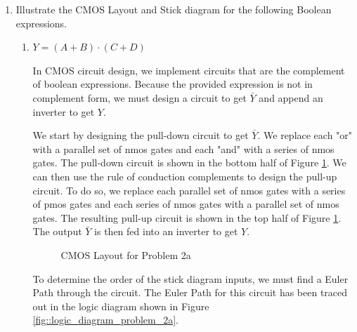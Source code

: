 \documentclass[fleqn]{article}
\begin{document}
\begin{enumerate}
		\item Illustrate the CMOS Layout and Stick diagram for the following Boolean expressions.
		
		\begin{enumerate}
			\item $Y = (A+B)\cdot(C+D)$
			
			In CMOS circuit design, we implement circuits that are the complement of boolean expressions. Because the provided expression is not in complement form, we must design a circuit to get $\bar{Y}$ and append an inverter to get $Y$.
			
			We start by designing the pull-down circuit to get $\bar{Y}$. We replace each "or" with a parallel set of nmos gates and each "and" with a series of nmos gates. The pull-down circuit is shown in the bottom half of Figure \ref{fig::cmos_layout_problem_2a}. We can then use the rule of conduction complements to design the pull-up circuit. To do so, we replace each parallel set of nmos gates with a series of pmos gates and each series of nmos gates with a parallel set of nmos gates. The resulting pull-up circuit is shown in the top half of Figure \ref{fig::cmos_layout_problem_2a}. The output $\bar{Y}$ is then fed into an inverter to get $Y$.
			
			\begin{figure}[H]
				\centerline{}
				\caption{CMOS Layout for Problem 2a}
				\label{fig::cmos_layout_problem_2a}
			\end{figure}
			
			To determine the order of the stick diagram inputs, we must find a Euler Path through the circuit. The Euler Path for this circuit has been traced out in the logic diagram shown in Figure \ref{fig::logic_diagram_problem_2a}.
			

\end{enumerate}
\end{enumerate}
\end{document}
